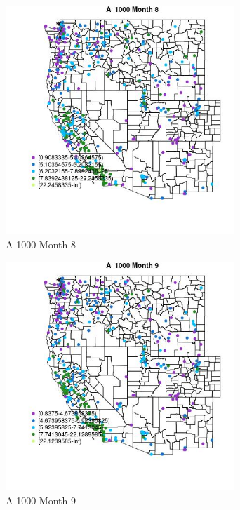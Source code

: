 \begin{figure} 
\centering  
\includegraphics[width=0.77\textwidth]{Code_Outputs/ML_input_report_ML_input_PM25_Step5_part_d_de_duplicated_aves_ML_input_MapObsMo8A_1000.jpg} 
\caption{\label{fig:ML_input_report_ML_input_PM25_Step5_part_d_de_duplicated_aves_ML_inputMapObsMo8A_1000}A-1000 Month 8} 
\end{figure} 
 

\begin{figure} 
\centering  
\includegraphics[width=0.77\textwidth]{Code_Outputs/ML_input_report_ML_input_PM25_Step5_part_d_de_duplicated_aves_ML_input_MapObsMo9A_1000.jpg} 
\caption{\label{fig:ML_input_report_ML_input_PM25_Step5_part_d_de_duplicated_aves_ML_inputMapObsMo9A_1000}A-1000 Month 9} 
\end{figure} 
 


